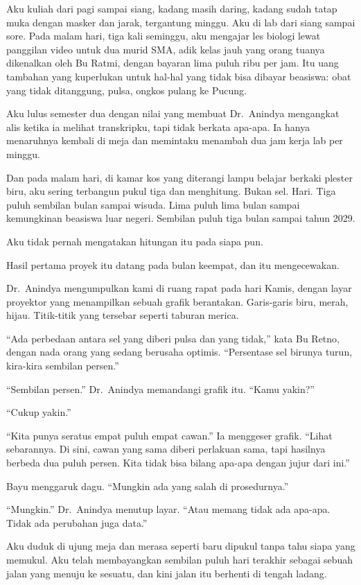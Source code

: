\documentclass[11pt,twoside,openany]{book}
\makeatletter
\newcommand{\scenebreak}{\par\vspace{0.9em}{\centering\textsc{*\hspace{0.7em}*\hspace{0.7em}*}\par}\vspace{0.9em}\@afterindentfalse\@afterheading}
\makeatother
\begin{document}
Aku kuliah dari pagi sampai siang, kadang masih daring, kadang sudah tatap muka dengan masker dan jarak, tergantung minggu. Aku di lab dari siang sampai sore. Pada malam hari, tiga kali seminggu, aku mengajar les biologi lewat panggilan video untuk dua murid SMA, adik kelas jauh yang orang tuanya dikenalkan oleh Bu Ratmi, dengan bayaran lima puluh ribu per jam. Itu uang tambahan yang kuperlukan untuk hal-hal yang tidak bisa dibayar beasiswa: obat yang tidak ditanggung, pulsa, ongkos pulang ke Pucung.

Aku lulus semester dua dengan nilai yang membuat Dr.~Anindya mengangkat alis ketika ia melihat transkripku, tapi tidak berkata apa-apa. Ia hanya menaruhnya kembali di meja dan memintaku menambah dua jam kerja lab per minggu.

Dan pada malam hari, di kamar kos yang diterangi lampu belajar berkaki plester biru, aku sering terbangun pukul tiga dan menghitung. Bukan sel. Hari. Tiga puluh sembilan bulan sampai wisuda. Lima puluh lima bulan sampai kemungkinan beasiswa luar negeri. Sembilan puluh tiga bulan sampai tahun 2029.

Aku tidak pernah mengatakan hitungan itu pada siapa pun.

\scenebreak
Hasil pertama proyek itu datang pada bulan keempat, dan itu mengecewakan.

Dr.~Anindya mengumpulkan kami di ruang rapat pada hari Kamis, dengan layar proyektor yang menampilkan sebuah grafik berantakan. Garis-garis biru, merah, hijau. Titik-titik yang tersebar seperti taburan merica.

``Ada perbedaan antara sel yang diberi pulsa dan yang tidak,'' kata Bu Retno, dengan nada orang yang sedang berusaha optimis. ``Persentase sel birunya turun, kira-kira sembilan persen.''

``Sembilan persen.'' Dr.~Anindya memandangi grafik itu. ``Kamu yakin?''

``Cukup yakin.''

``Kita punya seratus empat puluh empat cawan.'' Ia menggeser grafik. ``Lihat sebarannya. Di sini, cawan yang sama diberi perlakuan sama, tapi hasilnya berbeda dua puluh persen. Kita tidak bisa bilang apa-apa dengan jujur dari ini.''

Bayu menggaruk dagu. ``Mungkin ada yang salah di prosedurnya.''

``Mungkin.'' Dr.~Anindya menutup layar. ``Atau memang tidak ada apa-apa. Tidak ada perubahan juga data.''

Aku duduk di ujung meja dan merasa seperti baru dipukul tanpa tahu siapa yang memukul. Aku telah membayangkan sembilan puluh hari terakhir sebagai sebuah jalan yang menuju ke sesuatu, dan kini jalan itu berhenti di tengah ladang.
\end{document}
